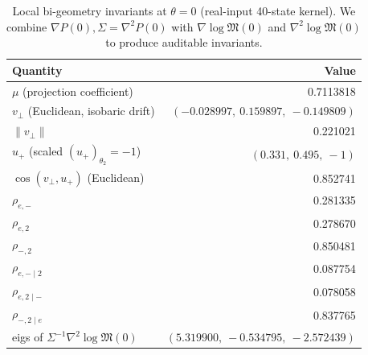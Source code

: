 \begin{table}[H]
\centering
\scriptsize
\setlength{\tabcolsep}{8pt}
\renewcommand{\arraystretch}{1.2}
\caption{Local bi-geometry invariants at $\theta=0$ (real-input 40-state kernel). We combine $\nabla P(0),\Sigma=\nabla^2P(0)$ with $\nabla\log\mathfrak{M}(0)$ and $\nabla^2\log\mathfrak{M}(0)$ to produce auditable invariants.}
\label{tab:real-input-40-local-bigeometry-invariants}
\begin{tabular}{@{}l r@{}}
\toprule
Quantity & Value\\
\midrule
$\mu$ (projection coefficient) & 0.7113818\\
$v_\perp$ (Euclidean, isobaric drift) & $(-0.028997,\ 0.159897,\ -0.149809)$\\
$\|v_\perp\|$ & 0.221021\\
$u_+$ (scaled $(u_+)_{\theta_2}=-1$) & $(0.331,\ 0.495,\ -1)$\\
$\cos(v_\perp,u_+)$ (Euclidean) & 0.852741\\
\midrule
$\rho_{e,-}$ & 0.281335\\
$\rho_{e,2}$ & 0.278670\\
$\rho_{-,2}$ & 0.850481\\
\midrule
$\rho_{e,-\mid 2}$ & 0.087754\\
$\rho_{e,2\mid -}$ & 0.078058\\
$\rho_{-,2\mid e}$ & 0.837765\\
\midrule
eigs of $\Sigma^{-1}\nabla^2\log\mathfrak{M}(0)$ & $(5.319900,\ -0.534795,\ -2.572439)$\\
\bottomrule
\end{tabular}
\end{table}
